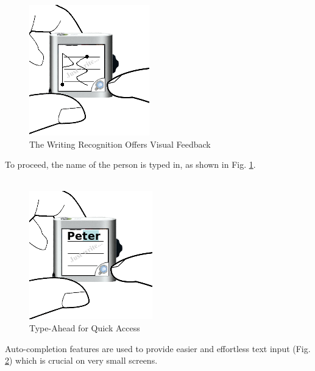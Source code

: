 %
\begin{figure}[h]
  \begin{center}
    \includegraphics[width=0.6\linewidth]{imgs/wt2.png}
  \end{center}
  \caption{The Writing Recognition Offers Visual Feedback}
  \label{fig:wt2}
\end{figure}
%
To proceed, the name of the person is typed in, as shown in Fig. \ref{fig:wt2}.
\\
\\
%
\begin{figure}[h]
  \begin{center}
    \includegraphics[width=0.6\linewidth]{imgs/wt3.png}
  \end{center}
  \caption{Type-Ahead for Quick Access}
  \label{fig:wt3}
\end{figure}
%
Auto-completion features are used to provide easier and effortless text input (Fig. \ref{fig:wt3}) which is crucial on very small screens.
